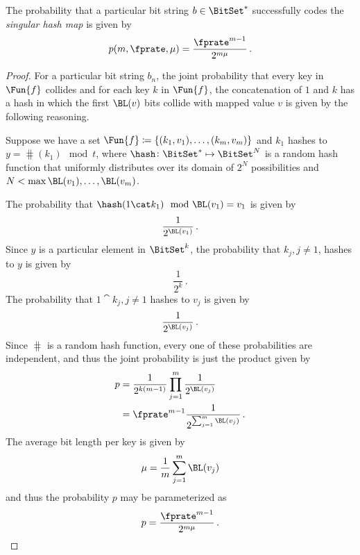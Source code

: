 \documentclass[ ../main.tex]{subfiles}
\begin{document}
\begin{theorem}
The probability that a particular bit string $b \in \BitSet^*$ successfully codes the \emph{singular hash map} is given by
\begin{equation}
    p(m,\fprate,\mu) = \frac{\fprate^{m-1}}{2^{m \mu}}\,.
\end{equation}
\end{theorem}
\begin{proof}
For a particular bit string $b_n$, the joint probability that every key in $\Fun{f}$ collides and for each key $k$ in $\Fun{f}$, the concatenation of $1$ and $k$ has a hash in which the first $\BL(v)$ bits collide with mapped value $v$ is given by the following reasoning.

Suppose we have a set $\Fun{f} \coloneqq \{(k_1,v_1),\ldots,(k_m,v_m)\}$ and $k_1$ hashes to $y = \hash(k_1) \mod t$, where $\hash \colon \BitSet^* \mapsto \BitSet^N$ is a random hash function that uniformly distributes over its domain of $2^N$ possibilities and $N < \max{\BL(v_1),\ldots,\BL(v_m)}$.

The probability that $\hash(1 \cat k_1) \mod \BL(v_1) = v_1$ is given by
\begin{equation}
    \frac{1}{2^{\BL(v_1)}}\,.
\end{equation}
Since $y$ is a particular element in $\BitSet^k$, the probability that $k_j, j \neq 1$, hashes to $y$ is given by
\begin{equation}
    \frac{1}{2^k}\,.
\end{equation}
The probability that $1 \cat k_j, j \neq 1$ hashes to $v_j$ is given by
\begin{equation}
    \frac{1}{2^{\BL(v_j)}}\,.
\end{equation}
Since $\hash$ is a random hash function, every one of these probabilities are independent, and thus the joint probability is just the product given by
\begin{align}
    p &= \frac{1}{2^{k(m-1)}} \prod_{j=1}^{m} \frac{1}{2^{\BL(v_j)}}\\
      &= \fprate^{m-1} \frac{1}{2^{\sum_{j=1}^{m} \BL(v_j)}}\,.
\end{align}
The average bit length per key is given by
\begin{equation}
    \mu = \frac{1}{m} \sum_{j=1}^{m} \BL(v_j)
\end{equation}
and thus the probability $p$ may be parameterized as
\begin{equation}
    p = \frac{\fprate^{m-1}}{2^{m \mu}}\,.
\end{equation}
\end{proof}
\end{document}
